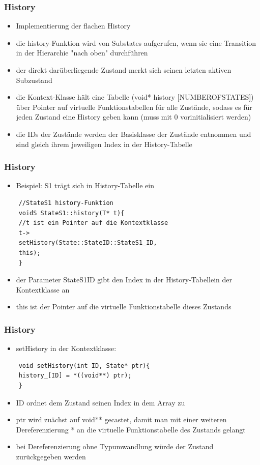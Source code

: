 \documentclass{beamer}
\begin{document}
\begin{frame}
	\frametitle{History}
	\begin{itemize}
		\item Implementierung der flachen History
		\item die history-Funktion wird von Substates aufgerufen, wenn sie eine Transition in der Hierarchie "nach oben" durchf\"uhren
		\item der direkt dar\"uberliegende Zustand merkt sich seinen letzten aktiven Subzustand
		\item die Kontext-Klasse h\"alt eine Tabelle (void* history [NUMBEROFSTATES]) \"uber Pointer auf virtuelle Funktionstabellen f\"ur alle Zust\"ande, sodass es f\"ur jeden Zustand eine History geben kann (muss mit 0 vorinitialisiert werden)
		\item die IDs der Zust\"ande werden der Basisklasse der Zust\"ande entnommen und sind gleich ihrem jeweiligen Index in der History-Tabelle
	\end{itemize}
\end{frame}

\begin{frame}[fragile]
	\frametitle{History}
	\begin{itemize}
		\item Beispiel: S1 tr\"agt sich in History-Tabelle ein
	\end{itemize}
	\begin{lstlisting}
	//StateS1 history-Funktion
	voidS StateS1::history(T* t){
	//t ist ein Pointer auf die Kontextklasse
	t->
	setHistory(State::StateID::StateS1_ID,
	this);
	}
	\end{lstlisting}
	\begin{itemize}
		\item der Parameter StateS1ID gibt den Index in der History-Tabellein der Kontextklasse an
		\item this ist der Pointer auf die virtuelle Funktionstabelle dieses Zustands 
	\end{itemize}
\end{frame}

\begin{frame}[fragile]
	\frametitle{History}
	\begin{itemize}
		\item setHistory in der Kontextklasse:
	\end{itemize}
	\begin{lstlisting}
	void setHistory(int ID, State* ptr){
	history_[ID] = *((void**) ptr);
	}
	\end{lstlisting}
	\begin{itemize}
		\item ID ordnet dem Zustand seinen Index in dem Array zu
		\item ptr wird zu\"achst auf void** gecastet, damit man mit einer weiteren Dereferenzierung * an die virtuelle Funktionstabelle des Zustands gelangt
		\item bei Dereferenzierung ohne Typumwandlung w\"urde der Zustand zur\"uckgegeben werden
	\end{itemize}
\end{frame}
\end{document}
